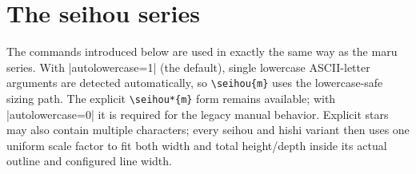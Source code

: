 \documentclass[luatex,fontsize=8pt,paper=b5,twoside]{jlreq}%
\begin{document}

\section{The seihou series}
The commands introduced below are used in exactly the same way as the maru series.
With \KKverb|autolowercase=1| (the default), single lowercase ASCII-letter arguments are
detected automatically, so \verb|\seihou{m}| uses the lowercase-safe sizing
path. The explicit \verb|\seihou*{m}| form remains available; with
\KKverb|autolowercase=0| it is required for the legacy manual behavior.
Explicit stars may also contain multiple characters; every seihou and hishi
variant then uses one uniform scale factor to fit both width and total
height/depth inside its actual outline and configured line width.

\bigskip
\end{document}
